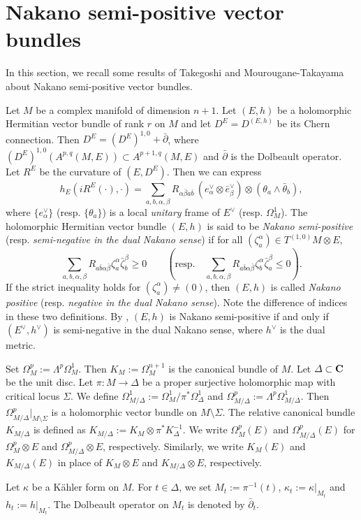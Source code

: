 \documentclass[amscd, leqno]{amsart}
\theoremstyle{plain}
\theoremstyle{definition}
\theoremstyle{remark}
\begin{document}
\section
{Nakano semi-positive vector bundles}
\label{sect:2}
\par
In this section, we recall some results of Takegoshi \cite{Takegoshi95} and Mourougane-Takayama \cite{MourouganeTakayama08} 
about Nakano semi-positive vector bundles. 
\par
Let $M$ be a complex manifold of dimension $n+1$. Let $(E,h)$ be a holomorphic Hermitian vector bundle of rank $r$ on $M$
and let $D^{E}=D^{(E,h)}$ be its Chern connection. Then $D^{E} = (D^{E})^{1,0} + \bar{\partial}$, 
where $(D^{E})^{1,0}(A^{p,q}(M,E)) \subset A^{p+1,q}(M,E)$ and $\bar{\partial}$ is the Dolbeault operator.
Let $R^{E}$ be the curvature of $(E, D^{E})$. Then we can express
$$
h_{E}(i R^{E}(\cdot),\cdot)
=
\sum_{a,b,\alpha,\beta}R_{\alpha\bar{\beta}a\bar{b}}\,(e^{\lor}_{\alpha}\otimes\bar{e}_{\beta}^{\lor})\otimes(\theta_{a}\wedge\bar{\theta}_{b}),
$$
where $\{e_{\alpha}^{\lor}\}$ (resp. $\{\theta_{a}\}$) is a local {\em unitary} frame of $E^{\lor}$ (resp. $\Omega^{1}_{M}$).
The holomorphic Hermitian vector bundle $(E,h)$ is said to be {\em Nakano semi-positive} 
(resp. {\em semi-negative in the dual Nakano sense}) if for all $(\zeta_{a}^{\alpha})\in T^{(1,0)}M\otimes E$,
$$
\sum_{a,b,\alpha,\beta}R_{a\bar{b}\alpha\bar{\beta}}\zeta_{a}^{\alpha}\bar{\zeta}_{b}^{\beta} \geq 0 
\qquad
( \text{resp.}\quad \sum_{a,b,\alpha,\beta}R_{a\bar{b}\alpha\bar{\beta}}\zeta_{b}^{\alpha}\bar{\zeta}_{a}^{\beta} \leq 0).
$$ 
If the strict inequality holds for $(\zeta_{a}^{\alpha})\not=(0)$, then $(E,h)$ is called {\em Nakano positive} 
(resp. {\em negative in the dual Nakano sense}). Note the difference of indices in these two definitions.
By \cite[Lemma 4.3]{Siu82}, $(E,h)$ is Nakano semi-positive if and only if $(E^{\lor},h^{\lor})$ is semi-negative in the dual Nakano sense,
where $h^{\lor}$ is the dual metric. 
\par
Set $\Omega_{M}^{p} := \Lambda^{p}\Omega_{M}^{1}$. 
Then $K_{M} := \Omega_{M}^{n+1}$ is the canonical bundle of $M$. Let $\varDelta\subset{\bf C}$ be the unit disc. 
Let $\pi\colon M\to\varDelta$ be a proper surjective holomorphic map with critical locus $\varSigma$. 
We define $\Omega_{M/\varDelta}^{1} := \Omega_{M}^{1}/\pi^{*}\Omega_{\varDelta}^{1}$ and 
$\Omega_{M/\varDelta}^{p} := \Lambda^{p} \Omega_{M/\varDelta}^{1}$. 
Then $\Omega_{M/\varDelta}^{p}|_{M\setminus\varSigma}$ is a holomorphic vector bundle on $M \setminus \varSigma$. 
The relative canonical bundle $K_{M/\varDelta}$ is defined as $K_{M/\varDelta} := K_{M}\otimes \pi^{*}K_{\varDelta}^{-1}$.
We write $\Omega_{M}^{p}(E)$ and $\Omega_{M/\varDelta}^{p}(E)$ for $\Omega_{M}^{p}\otimes E$ and 
$\Omega_{M/\varDelta}^{p}\otimes E$, respectively. Similarly, we write $K_{M}(E)$ and $K_{M/\varDelta}(E)$ in place of $K_{M}\otimes E$
and $K_{M/\varDelta}\otimes E$, respectively. 
\par
Let $\kappa$ be a K\"ahler form on $M$.
For $t\in\varDelta$, we set $M_{t}:=\pi^{-1}(t)$, $\kappa_{t}:=\kappa|_{M_{t}}$ and $h_{t}:=h|_{M_{t}}$. 
The Dolbeault operator on $M_{t}$ is denoted by $\bar{\partial}_{t}$.
\end{document}

